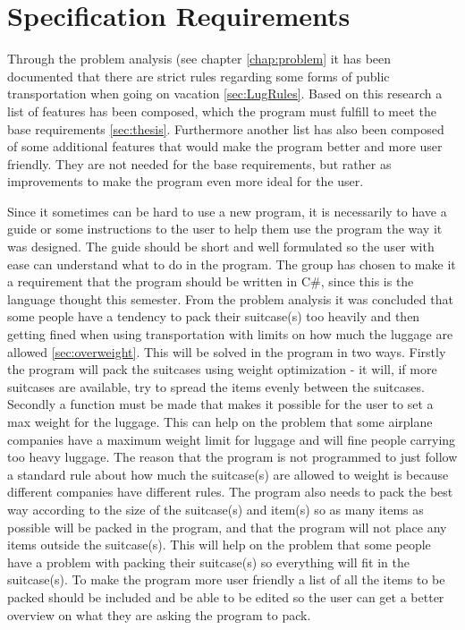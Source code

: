 \section{Specification Requirements}
\label{sec:Spec}
Through the problem analysis (see chapter \ref{chap:problem} it has been documented that there are strict rules regarding some forms of public transportation when going on vacation \ref{sec:LugRules}. Based on this research a list of features has been composed, which the program must fulfill to meet the base requirements \ref{sec:thesis}. Furthermore another list has also been composed of some additional features that would make the program better and more user friendly. They are not needed for the base requirements, but rather as improvements to make the program even more ideal for the user.

Since it sometimes can be hard to use a new program, it is necessarily to have a guide or some instructions to the user to help them use the program the way it was designed. The guide should be short and well formulated so the user with ease can understand what to do in the program.
The group has chosen to make it a requirement that the program should be written in C\#, since this is the language thought this semester.
From the problem analysis it was concluded that some people have a tendency to pack their suitcase(s) too heavily and then getting fined when using transportation with limits on how much the luggage are allowed \ref{sec:overweight}. 
This will be solved in the program in two ways. 
Firstly the program will pack the suitcases using weight optimization - it will, if more suitcases are available, try to spread the items evenly between the suitcases. 
Secondly a function must be made that makes it possible for the user to set a max weight for the luggage. This can help on the problem that some airplane companies have a maximum weight limit for luggage and will fine people carrying too heavy luggage. The reason that the program is not programmed to just follow a standard rule about how much the suitcase(s) are allowed to weight is because different companies have different rules.
The program also needs to pack the best way according to the size of the suitcase(s) and item(s) so as many items as possible will be packed in the program, and that the program will not place any items outside the suitcase(s). This will help on the problem that some people have a problem with packing their suitcase(s) so everything will fit in the suitcase(s).
To make the program more user friendly a list of all the items to be packed should be included and be able to be edited so the user can get a better overview on what they are asking the program to pack.
